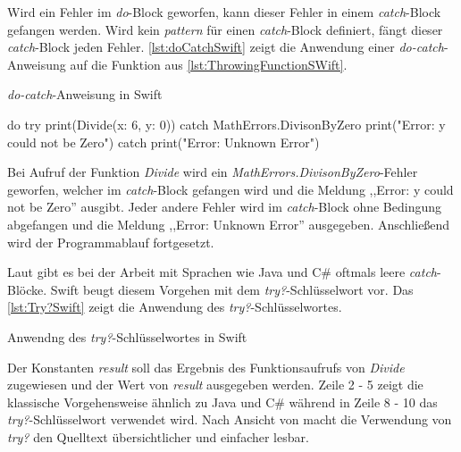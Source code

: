Wird ein Fehler im \textit{do}-Block geworfen, kann dieser Fehler in einem \textit{catch}-Block gefangen werden. 
Wird kein \textit{pattern} für einen \textit{catch}-Block definiert, fängt dieser \textit{catch}-Block jeden Fehler. 
\autoref{lst:doCatchSwift} zeigt die Anwendung einer \textit{do-catch}-Anweisung auf die Funktion aus \autoref{lst:ThrowingFunctionSWift}.

\begin{listing}[H]
\caption{\textit{do-catch}-Anweisung in Swift}
\label{lst:doCatchSwift}
\begin{SwiftCode}
do {
    try print(Divide(x: 6, y: 0))	
} catch MathErrors.DivisonByZero {	
    print("Error: y could not be Zero")
} catch {
    print("Error: Unknown Error")
}
\end{SwiftCode}
\end{listing}

Bei Aufruf der Funktion \textit{Divide} wird ein \textit{MathErrors.DivisonByZero}-Fehler geworfen, welcher im \textit{catch}-Block gefangen wird und die Meldung ,,Error: y could not be Zero'' ausgibt. 
Jeder andere Fehler wird im \textit{catch}-Block ohne Bedingung abgefangen und die Meldung ,,Error: Unknown Error'' ausgegeben.
Anschließend wird der Programmablauf fortgesetzt.

Laut \cite[S.181]{Hoffman.2017} gibt es bei der Arbeit mit Sprachen wie Java und C\# oftmals leere \textit{catch}-Blöcke. 
Swift beugt diesem Vorgehen mit dem \textit{try?}-Schlüsselwort vor. 
Das \autoref{lst:Try?Swift} zeigt die Anwendung des \textit{try?}-Schlüsselwortes.

\begin{listing}
\caption{Anwendng des \textit{try?}-Schlüsselwortes in Swift}
\label{lst:Try?Swift}
\end{listing}

Der Konstanten \textit{result} soll das Ergebnis des Funktionsaufrufs von \textit{Divide} zugewiesen und der Wert von \textit{result} ausgegeben werden. 
Zeile 2 - 5 zeigt die klassische Vorgehensweise ähnlich zu Java und C\# während in Zeile 8 - 10 das \textit{try?}-Schlüsselwort verwendet wird.
Nach Ansicht von \cite[S181]{Hoffman.2017} macht die Verwendung von \textit{try?} den Quelltext übersichtlicher und einfacher lesbar.

